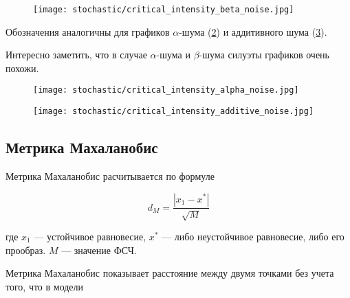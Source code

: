         \begin{figure}
            \centering
            \texttt{[image: stochastic/critical\_intensity\_beta\_noise.jpg]}
        
            \captionsetup{justification=centering}
            \caption{}
            \label{critical_intensity_beta_noise}
        \end{figure}
        
        Обозначения аналогичны для графиков \(\alpha\)-шума (\ref{critical_intensity_alpha_noise}) и аддитивного шума (\ref{critical_intensity_additive_noise}).

        Интересно заметить, что в случае \(\alpha\)-шума и \(\beta\)-шума силуэты графиков очень похожи.

        \begin{figure}
            \centering
            \texttt{[image: stochastic/critical\_intensity\_alpha\_noise.jpg]}
        
            \captionsetup{justification=centering}
            \caption{}
            \label{critical_intensity_alpha_noise}
        \end{figure}

        \begin{figure}
            \centering
            \texttt{[image: stochastic/critical\_intensity\_additive\_noise.jpg]}
        
            \captionsetup{justification=centering}
            \caption{}
            \label{critical_intensity_additive_noise}
        \end{figure}


    \subsection{Метрика Махаланобис}
        

        Метрика Махаланобис расчитывается по формуле 

        \[
            d_M = \frac{|x_1 - x^*|}{\sqrt{M}}
        \]
        
        где \(x_1\) --- устойчивое равновесие, \(x^*\) --- либо неустойчивое равновесие, либо его прообраз. \(M\) --- значение ФСЧ.

        Метрика Махаланобис показывает расстояние между двумя точками без учета того, что в модели 


